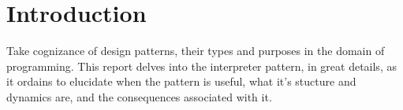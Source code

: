 \section{Introduction}
Take cognizance of design patterns, their types and purposes in the domain of 
programming. This report delves into the interpreter pattern, in great details,
as it ordains to elucidate when the pattern is useful, what it's stucture and
dynamics are, and the consequences associated with it.





\newpage
